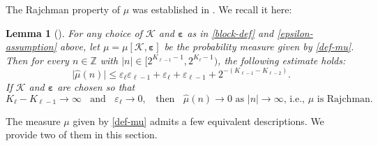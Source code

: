 \documentclass[12pt, twoside]{article}
\newtheorem{lemma}[theorem]{Lemma}
\theoremstyle{definition}
\numberwithin{equation}{section}
\begin{document}
The Rajchman property of $\mu$ was established in \cite{l86}. We recall it here:
\begin{lemma}[{\cite[Lemma 9]{l86}}] \label{Lyons-lemma}
For any choice of $\mathcal K$ and $\pmb{\varepsilon}$ as in \eqref{block-def} and \eqref{epsilon-assumption} above, let $\mu = \mu[\mathcal K, \pmb{\varepsilon}]$ be the probability measure given by \eqref{def-mu}. Then for every $n \in \mathbb Z$ with $|n| \in [2^{K_{\ell-1}-1}, 2^{K_{\ell}-1})$, the following estimate holds: 
\begin{equation} \bigl| \widehat{\mu}(n) \bigr| \leq \varepsilon_{\ell} \varepsilon_{\ell-1} + \varepsilon_{\ell} + \varepsilon_{\ell-1} + 2^{-(K_{\ell-1} - K_{\ell-2})}.  \label{mu-Rajchman} 
\end{equation} 
If $\mathcal K$ and $\pmb{\varepsilon}$ are chosen so that 
\[ K_{\ell} - K_{\ell-1} \rightarrow \infty \; \; \text{ and } \; \; \varepsilon_{\ell} \rightarrow 0, \; \; \text{ then } \; \; \widehat{\mu}(n) \rightarrow 0 \text{ as $|n| \rightarrow \infty$, i.e., $\mu$ is Rajchman.}  \]  
\end{lemma} 
\noindent The measure $\mu$ given by \eqref{def-mu} admits a few equivalent descriptions. We provide two of them in this section. 
\end{document}
